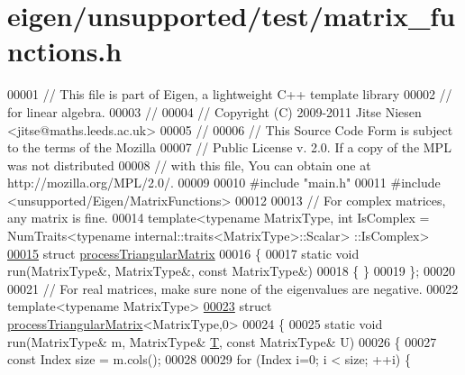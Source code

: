 \hypertarget{eigen_2unsupported_2test_2matrix__functions_8h_source}{}\section{eigen/unsupported/test/matrix\+\_\+functions.h}
\label{eigen_2unsupported_2test_2matrix__functions_8h_source}

\begin{DoxyCode}
00001 \textcolor{comment}{// This file is part of Eigen, a lightweight C++ template library}
00002 \textcolor{comment}{// for linear algebra.}
00003 \textcolor{comment}{//}
00004 \textcolor{comment}{// Copyright (C) 2009-2011 Jitse Niesen <jitse@maths.leeds.ac.uk>}
00005 \textcolor{comment}{//}
00006 \textcolor{comment}{// This Source Code Form is subject to the terms of the Mozilla}
00007 \textcolor{comment}{// Public License v. 2.0. If a copy of the MPL was not distributed}
00008 \textcolor{comment}{// with this file, You can obtain one at http://mozilla.org/MPL/2.0/.}
00009 
00010 \textcolor{preprocessor}{#include "main.h"}
00011 \textcolor{preprocessor}{#include <unsupported/Eigen/MatrixFunctions>}
00012 
00013 \textcolor{comment}{// For complex matrices, any matrix is fine.}
00014 template<typename MatrixType, int IsComplex = NumTraits<typename internal::traits<MatrixType>::Scalar>
      ::IsComplex>
\hyperlink{structprocess_triangular_matrix}{00015} \textcolor{keyword}{struct }\hyperlink{structprocess_triangular_matrix}{processTriangularMatrix}
00016 \{
00017   \textcolor{keyword}{static} \textcolor{keywordtype}{void} run(MatrixType&, MatrixType&, \textcolor{keyword}{const} MatrixType&)
00018   \{ \}
00019 \};
00020 
00021 \textcolor{comment}{// For real matrices, make sure none of the eigenvalues are negative.}
00022 \textcolor{keyword}{template}<\textcolor{keyword}{typename} MatrixType>
\hyperlink{structprocess_triangular_matrix_3_01_matrix_type_00_010_01_4}{00023} \textcolor{keyword}{struct }\hyperlink{structprocess_triangular_matrix}{processTriangularMatrix}<MatrixType,0>
00024 \{
00025   \textcolor{keyword}{static} \textcolor{keywordtype}{void} run(MatrixType& m, MatrixType& \hyperlink{group___sparse_core___module}{T}, \textcolor{keyword}{const} MatrixType& U)
00026   \{
00027     \textcolor{keyword}{const} Index size = m.cols();
00028 
00029     \textcolor{keywordflow}{for} (Index i=0; i < size; ++i) \{

\end{DoxyCode}
